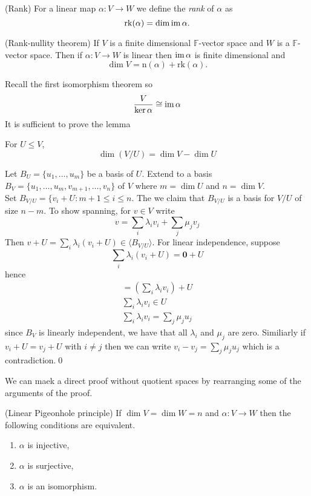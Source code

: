 \documentclass{article}
\newcommand{\F}{\mathbb{F}}
\newcommand{\n}{\mathrm{n}}
\newcommand{\rk}{\mathrm{rk}}
\begin{document}
\begin{definition}
	(Rank) For a linear map $ \alpha:V\to W $ we define the \textit{rank} of $ \alpha $ as
	\[
	  \rk(\alpha)=\dim\ima\alpha.
	\]
\end{definition}
\begin{theorem}
	(Rank-nullity theorem) If $ V $ is a finite dimensional $ \F $-vector space and $ W  $ is a $ \F $-vector space. Then if $ \alpha:V\to W $ is linear then $ \operatorname{im} \alpha $ is finite dimensional and
	\[
	  \dim V=\n(\alpha)+\rk(\alpha).
	\]
\end{theorem}
\pf Recall the first isomorphism theorem so
\[
	\frac V{\ker \alpha}\cong \operatorname{im}\alpha
\]
It is sufficient to prove the lemma
\begin{lemma}
  For $ U\le V $,
  \[
    \dim(V/U)=\dim V-\dim U
  \]
\end{lemma}
\pf Let $ B_U=\{u_1,\dots, u_m\} $ be a basis of $ U $. Extend to a basis $ B_V=\{u_1,\dots, u_m,v_{m+1},\dots, v_n\} $ of $ V $ where $ m=\dim U $ and $ n=\dim V $.\\
Set $ B_{V/U}=\{v_i+U:m+1\le i\le n $. The we claim that $ B_{V/U} $ is a basis for $ V/U $ of size $ n-m $. To show spanning, for $ v\in V $ write
	\[
	  v=\sum_i\lambda_iv_i+\sum_j\mu_jv_j
	\]
	Then $ v+U=\sum_i\lambda_i(v_i+U)\in \langle B_{V/U}\rangle $. For linear independence, suppose
	\[
	  \sum_i\lambda_i(v_i+U)=\mathbf 0+U
  \]
	hence 
	\begin{align*}
	  =\left(\sum_i\lambda_iv_i\right)+U \\
	  \sum_i\lambda_iv_i\in U\\
	  \sum_i\lambda_iv_i=\sum_j\mu_ju_j
	\end{align*}
	since $ B_V $ is linearly independent, we have that all $ \lambda_i $ and $ \mu_j $ are zero. Similiarly if $ v_i+U=v_j+U $ with $ i\ne j $ then we can write $ v_i-v_j=\sum_j\mu_ju_j $ which is a contradiction.\qed
	\begin{remark}
	   We can maek a direct proof without quotient spaces by rearranging some of the arguments of the proof.
	\end{remark}
\begin{corollary}
	(Linear Pigeonhole principle) If $ \dim V=\dim W=n $ and $ \alpha: V\to W $ then the following conditions are equivalent.
	\begin{enumerate}
		\item $ \alpha $ is injective,
		\item $ \alpha $ is surjective,
		\item $ \alpha $ is an isomorphism.
	\end{enumerate}
\end{corollary}
\end{document}
